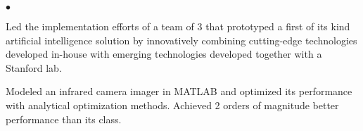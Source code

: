 \documentclass[11pt]{article}
\newcommand{\employer}[3]{{ \textbf{#1} \\ \underline{\textbf{\emph{#3}}} \hfill  #2\\  }}
\newenvironment{achievements}{\begin{list}{$\bullet$}{\topsep 0pt \itemsep -2pt}}{\vspace*{4pt}\end{list}}
\begin{document}
\begin{achievements}
        \item Led the implementation efforts of a team of 3 that prototyped a first of its kind artificial intelligence solution by innovatively combining cutting-edge technologies developed in-house with emerging technologies developed together with a Stanford lab.
    \item Modeled an infrared camera imager in MATLAB and optimized its performance with analytical optimization methods. Achieved 2 orders of magnitude better performance than its class.
	\end{achievements}






\end{document}
